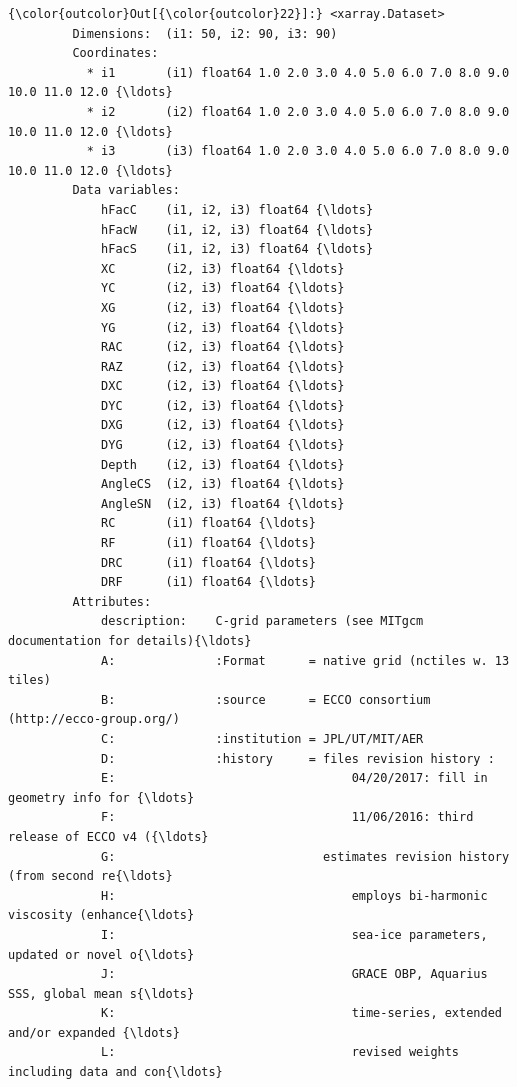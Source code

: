 \documentclass[11pt]{article}
\begin{document}
\begin{Verbatim}[commandchars=\\\{\}]
{\color{outcolor}Out[{\color{outcolor}22}]:} <xarray.Dataset>
         Dimensions:  (i1: 50, i2: 90, i3: 90)
         Coordinates:
           * i1       (i1) float64 1.0 2.0 3.0 4.0 5.0 6.0 7.0 8.0 9.0 10.0 11.0 12.0 {\ldots}
           * i2       (i2) float64 1.0 2.0 3.0 4.0 5.0 6.0 7.0 8.0 9.0 10.0 11.0 12.0 {\ldots}
           * i3       (i3) float64 1.0 2.0 3.0 4.0 5.0 6.0 7.0 8.0 9.0 10.0 11.0 12.0 {\ldots}
         Data variables:
             hFacC    (i1, i2, i3) float64 {\ldots}
             hFacW    (i1, i2, i3) float64 {\ldots}
             hFacS    (i1, i2, i3) float64 {\ldots}
             XC       (i2, i3) float64 {\ldots}
             YC       (i2, i3) float64 {\ldots}
             XG       (i2, i3) float64 {\ldots}
             YG       (i2, i3) float64 {\ldots}
             RAC      (i2, i3) float64 {\ldots}
             RAZ      (i2, i3) float64 {\ldots}
             DXC      (i2, i3) float64 {\ldots}
             DYC      (i2, i3) float64 {\ldots}
             DXG      (i2, i3) float64 {\ldots}
             DYG      (i2, i3) float64 {\ldots}
             Depth    (i2, i3) float64 {\ldots}
             AngleCS  (i2, i3) float64 {\ldots}
             AngleSN  (i2, i3) float64 {\ldots}
             RC       (i1) float64 {\ldots}
             RF       (i1) float64 {\ldots}
             DRC      (i1) float64 {\ldots}
             DRF      (i1) float64 {\ldots}
         Attributes:
             description:    C-grid parameters (see MITgcm documentation for details){\ldots}
             A:              :Format      = native grid (nctiles w. 13 tiles)
             B:              :source      = ECCO consortium (http://ecco-group.org/)
             C:              :institution = JPL/UT/MIT/AER
             D:              :history     = files revision history :
             E:                                 04/20/2017: fill in geometry info for {\ldots}
             F:                                 11/06/2016: third release of ECCO v4 ({\ldots}
             G:                             estimates revision history (from second re{\ldots}
             H:                                 employs bi-harmonic viscosity (enhance{\ldots}
             I:                                 sea-ice parameters, updated or novel o{\ldots}
             J:                                 GRACE OBP, Aquarius SSS, global mean s{\ldots}
             K:                                 time-series, extended and/or expanded {\ldots}
             L:                                 revised weights including data and con{\ldots}

\end{Verbatim}
\end{document}
